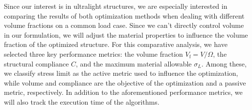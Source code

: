 Since our interest is in ultralight structures, we are especially interested in comparing the results of both optimization methods when dealing with different volume fractions on a common load case. Since we can't directly control volume in our formulation, we will adjust the material properties to influence the volume fraction of the optimized structure. For this comparative analysis, we have selected three key performance metrics: the volume fraction $V_\text{f}=V/\Omega$, the structural compliance $C$, and the maximum material allowable $\sigma_L$. Among these, we classify stress limit as the active metric used to influence the optimization, while volume and compliance are the objective of the optimization and a passive metric, respectively. In addition to the aforementioned performance metrics, we will also track the execution time of the algorithms.

